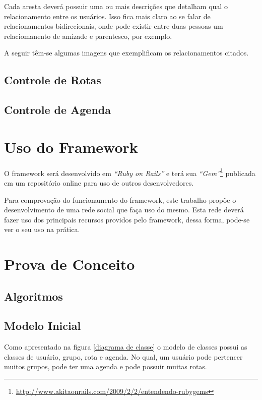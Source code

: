 Cada aresta deverá possuir uma ou mais descrições que detalham qual o relacionamento entre os usuários. Isso fica mais claro ao se falar de relacionamentos bidirecionais, onde pode existir entre duas pessoas um relaciomanento de amizade e parentesco, por exemplo.

A seguir têm-se algumas imagens que exemplificam os relacionamentos citados.




\subsection{Controle de Rotas}

\subsection{Controle de Agenda}

\section{Uso do Framework}

O framework será desenvolvido em \textit{``Ruby on Rails''} e terá sua \textit{``Gem''}\footnote{\url{http://www.akitaonrails.com/2009/2/2/entendendo-rubygems}} publicada em um repositório online para uso de outros desenvolvedores.

Para comprovação do funcionamento do framework, este trabalho propõe o desenvolvimento de uma rede social que faça uso do mesmo. Esta rede deverá fazer uso dos principais recursos providos pelo framework, dessa forma, pode-se ver o seu uso na prática.

\section{Prova de Conceito}

\subsection{Algoritmos}

\subsection{Modelo Inicial}

Como apresentado na figura \ref{diagrama de classe} o modelo de classes possui as classes de usuário, grupo, rota e agenda. No qual, um usuário pode pertencer muitos grupos, pode ter uma agenda e pode possuir muitas rotas.

